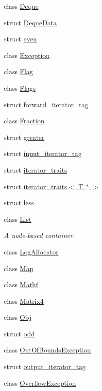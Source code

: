 \begin{DoxyCompactItemize}
\item 
class \hyperlink{classprism_1_1_deque}{Deque}
\item 
struct \hyperlink{structprism_1_1_deque_data}{Deque\+Data}
\item 
struct \hyperlink{structprism_1_1even}{even}
\item 
class \hyperlink{classprism_1_1_exception}{Exception}
\item 
class \hyperlink{classprism_1_1_flag}{Flag}
\item 
class \hyperlink{classprism_1_1_flags}{Flags}
\item 
struct \hyperlink{structprism_1_1forward__iterator__tag}{forward\+\_\+iterator\+\_\+tag}
\item 
class \hyperlink{classprism_1_1_fraction}{Fraction}
\item 
struct \hyperlink{structprism_1_1greater}{greater}
\item 
struct \hyperlink{structprism_1_1input__iterator__tag}{input\+\_\+iterator\+\_\+tag}
\item 
struct \hyperlink{structprism_1_1iterator__traits}{iterator\+\_\+traits}
\item 
struct \hyperlink{structprism_1_1iterator__traits_3_01_t_01_5_01_4}{iterator\+\_\+traits$<$ T $\ast$ $>$}
\item 
struct \hyperlink{structprism_1_1less}{less}
\item 
class \hyperlink{classprism_1_1_list}{List}
\begin{DoxyCompactList}\small\item\em A node-\/based container. \end{DoxyCompactList}\item 
class \hyperlink{classprism_1_1_log_allocator}{Log\+Allocator}
\item 
class \hyperlink{classprism_1_1_map}{Map}
\item 
class \hyperlink{classprism_1_1_mathf}{Mathf}
\item 
class \hyperlink{classprism_1_1_matrix4}{Matrix4}
\item 
class \hyperlink{classprism_1_1_obj}{Obj}
\item 
struct \hyperlink{structprism_1_1odd}{odd}
\item 
class \hyperlink{classprism_1_1_out_of_bounds_exception}{Out\+Of\+Bounds\+Exception}
\item 
struct \hyperlink{structprism_1_1output__iterator__tag}{output\+\_\+iterator\+\_\+tag}
\item 
class \hyperlink{classprism_1_1_overflow_exception}{Overflow\+Exception}

\end{DoxyCompactItemize}
